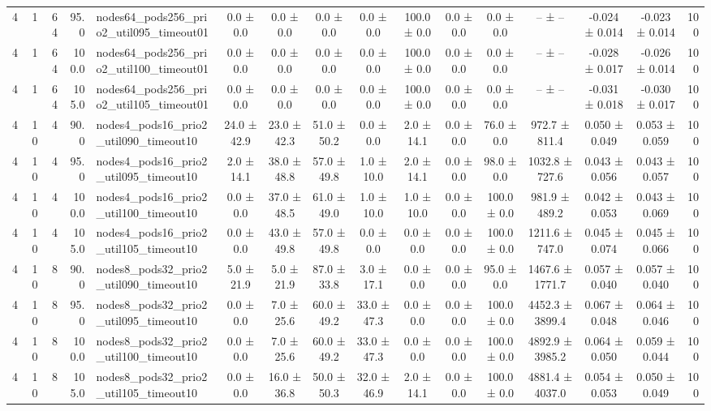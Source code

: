 \begin{tabular}{r r r r l c c c c c c c c c c r}
4 & 1 & 64 & 95.0 & nodes64\_pods256\_prio2\_util095\_timeout01 & 0.0 ± 0.0 & 0.0 ± 0.0 & 0.0 ± 0.0 & 0.0 ± 0.0 & 100.0 ± 0.0 & 0.0 ± 0.0 & 0.0 ± 0.0 & -- ± -- & -0.024 ± 0.014 & -0.023 ± 0.014 & 100 \\
4 & 1 & 64 & 100.0 & nodes64\_pods256\_prio2\_util100\_timeout01 & 0.0 ± 0.0 & 0.0 ± 0.0 & 0.0 ± 0.0 & 0.0 ± 0.0 & 100.0 ± 0.0 & 0.0 ± 0.0 & 0.0 ± 0.0 & -- ± -- & -0.028 ± 0.017 & -0.026 ± 0.014 & 100 \\
4 & 1 & 64 & 105.0 & nodes64\_pods256\_prio2\_util105\_timeout01 & 0.0 ± 0.0 & 0.0 ± 0.0 & 0.0 ± 0.0 & 0.0 ± 0.0 & 100.0 ± 0.0 & 0.0 ± 0.0 & 0.0 ± 0.0 & -- ± -- & -0.031 ± 0.018 & -0.030 ± 0.017 & 100 \\
4 & 10 & 4 & 90.0 & nodes4\_pods16\_prio2\_util090\_timeout10 & 24.0 ± 42.9 & 23.0 ± 42.3 & 51.0 ± 50.2 & 0.0 ± 0.0 & 2.0 ± 14.1 & 0.0 ± 0.0 & 76.0 ± 0.0 & 972.7 ± 811.4 & 0.050 ± 0.049 & 0.053 ± 0.059 & 100 \\
4 & 10 & 4 & 95.0 & nodes4\_pods16\_prio2\_util095\_timeout10 & 2.0 ± 14.1 & 38.0 ± 48.8 & 57.0 ± 49.8 & 1.0 ± 10.0 & 2.0 ± 14.1 & 0.0 ± 0.0 & 98.0 ± 0.0 & 1032.8 ± 727.6 & 0.043 ± 0.056 & 0.043 ± 0.057 & 100 \\
4 & 10 & 4 & 100.0 & nodes4\_pods16\_prio2\_util100\_timeout10 & 0.0 ± 0.0 & 37.0 ± 48.5 & 61.0 ± 49.0 & 1.0 ± 10.0 & 1.0 ± 10.0 & 0.0 ± 0.0 & 100.0 ± 0.0 & 981.9 ± 489.2 & 0.042 ± 0.053 & 0.043 ± 0.069 & 100 \\
4 & 10 & 4 & 105.0 & nodes4\_pods16\_prio2\_util105\_timeout10 & 0.0 ± 0.0 & 43.0 ± 49.8 & 57.0 ± 49.8 & 0.0 ± 0.0 & 0.0 ± 0.0 & 0.0 ± 0.0 & 100.0 ± 0.0 & 1211.6 ± 747.0 & 0.045 ± 0.074 & 0.045 ± 0.066 & 100 \\
4 & 10 & 8 & 90.0 & nodes8\_pods32\_prio2\_util090\_timeout10 & 5.0 ± 21.9 & 5.0 ± 21.9 & 87.0 ± 33.8 & 3.0 ± 17.1 & 0.0 ± 0.0 & 0.0 ± 0.0 & 95.0 ± 0.0 & 1467.6 ± 1771.7 & 0.057 ± 0.040 & 0.057 ± 0.040 & 100 \\
4 & 10 & 8 & 95.0 & nodes8\_pods32\_prio2\_util095\_timeout10 & 0.0 ± 0.0 & 7.0 ± 25.6 & 60.0 ± 49.2 & 33.0 ± 47.3 & 0.0 ± 0.0 & 0.0 ± 0.0 & 100.0 ± 0.0 & 4452.3 ± 3899.4 & 0.067 ± 0.048 & 0.064 ± 0.046 & 100 \\
4 & 10 & 8 & 100.0 & nodes8\_pods32\_prio2\_util100\_timeout10 & 0.0 ± 0.0 & 7.0 ± 25.6 & 60.0 ± 49.2 & 33.0 ± 47.3 & 0.0 ± 0.0 & 0.0 ± 0.0 & 100.0 ± 0.0 & 4892.9 ± 3985.2 & 0.064 ± 0.050 & 0.059 ± 0.044 & 100 \\
4 & 10 & 8 & 105.0 & nodes8\_pods32\_prio2\_util105\_timeout10 & 0.0 ± 0.0 & 16.0 ± 36.8 & 50.0 ± 50.3 & 32.0 ± 46.9 & 2.0 ± 14.1 & 0.0 ± 0.0 & 100.0 ± 0.0 & 4881.4 ± 4037.0 & 0.054 ± 0.053 & 0.050 ± 0.049 & 100 \\

\end{tabular}
